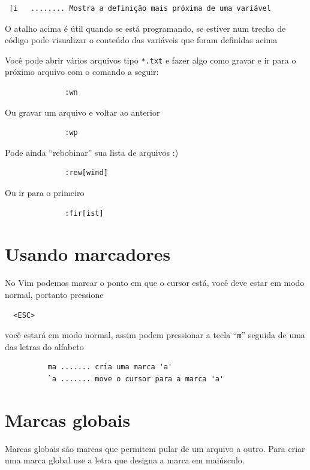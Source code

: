 \documentclass[10pt,a4paper,openany]{book}
\begin{document}
\begin{verbatim}
 [i   ........ Mostra a definição mais próxima de uma variável
\end{verbatim}

O atalho acima é útil quando se está programando, se estiver num
trecho de código pode visualizar o conteúdo das variáveis que foram
definidas acima

Você pode abrir vários arquivos tipo \verb|*.txt| e fazer
algo como gravar e ir para o próximo arquivo com o comando a
seguir:

\begin{verbatim}
			  :wn
\end{verbatim}

Ou gravar um arquivo e voltar ao anterior

\begin{verbatim}
			  :wp
\end{verbatim}

Pode ainda ``rebobinar'' sua lista de arquivos :)

\begin{verbatim}
			  :rew[wind]
\end{verbatim}

Ou ir para o primeiro

\begin{verbatim}
			  :fir[ist]
\end{verbatim}

\section{Usando marcadores}
\label{Usando marcadores}

No Vim podemos marcar o ponto em que o cursor está, você deve estar em
modo normal, portanto pressione

\begin{verbatim}
  <ESC>
\end{verbatim}

você estará em modo normal, assim podem pressionar a tecla ``\verb+m+''
seguida de uma das letras do alfabeto

\begin{verbatim}
		  ma ....... cria uma marca 'a'
		  `a ....... move o cursor para a marca 'a'
\end{verbatim}

\section{Marcas globais}
\label{Marcas globais}
Marcas globais são marcas que permitem pular de um arquivo a outro.
Para criar uma marca global use a letra que designa a marca em
maiúsculo.
\end{document}

